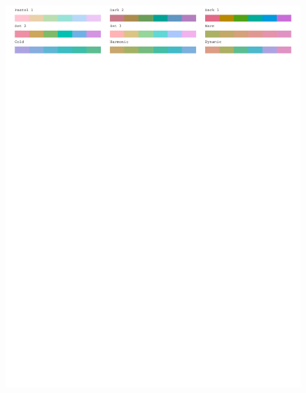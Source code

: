 \begin{figure}[H]
\centering
\includegraphics[width = \textwidth, trim= 0 5in 0 0, clip]{graphics/appFigs/hcl_pals_qual.pdf}
\end{figure}

\vfill
